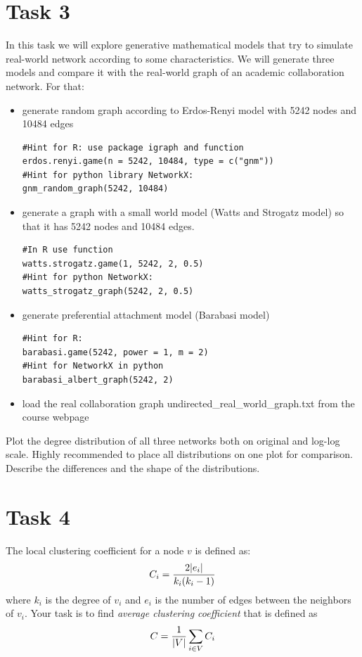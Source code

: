 \documentclass{article}
\DeclarePairedDelimiter\abs{\lvert}{\rvert}%
\begin{document}
\section*{Task 3}
In this task we will explore generative mathematical models that try to simulate real-world network according to some characteristics. We will generate three models and compare it with the real-world graph of an academic collaboration network. For that:
\begin{itemize}
\item generate random graph according to Erdos-Renyi model with 5242 nodes and 10484 edges 
\begin{lstlisting}
#Hint for R: use package igraph and function 
erdos.renyi.game(n = 5242, 10484, type = c("gnm"))
#Hint for python library NetworkX: 
gnm_random_graph(5242, 10484)
\end{lstlisting}
\item generate a graph with a small world model (Watts and Strogatz model) so that it has 5242 nodes and 10484 edges. 
\begin{lstlisting}
#In R use function
watts.strogatz.game(1, 5242, 2, 0.5)
#Hint for python NetworkX: 
watts_strogatz_graph(5242, 2, 0.5)
\end{lstlisting}
\item generate preferential attachment model (Barabasi model)
\begin{lstlisting}
#Hint for R: 
barabasi.game(5242, power = 1, m = 2)
#Hint for NetworkX in python 
barabasi_albert_graph(5242, 2)
\end{lstlisting}
\item  load the real collaboration graph undirected\_real\_world\_graph.txt from the course webpage
\end{itemize}
Plot the degree distribution of all three networks both on original and log-log scale. Highly recommended to place all distributions on one plot for comparison. Describe the differences and the shape of the distributions.
 
\section*{Task 4}
The local clustering coefficient for a node $v$ is defined as:
$$C_i = \frac{2\abs{e_i}}{k_i(k_i-1)}$$
where $k_i$ is the degree of $v_i$ and $e_i$ is the number of edges between the neighbors of $v_i$. Your task is to find \emph{average clustering coefficient} that is defined as 
$$C = \frac{1}{\abs{V}}\sum_{i\in V}C_i$$
\end{document}
